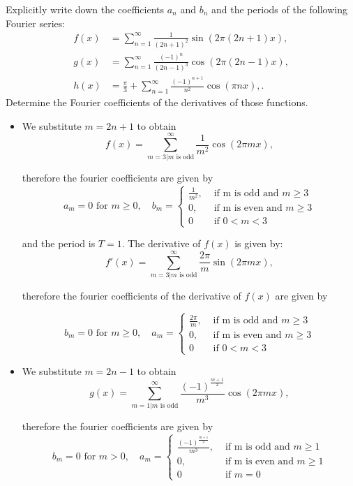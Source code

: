 \documentclass[11pt]{article}
\begin{document}
\begin{exercise}
    Explicitly write down the coefficients $a_n$ and $b_n$ and the periods of the following Fourier series:
    \begin{align*}
        f(x) &= \sum_{n=1}^{\infty} \frac{1}{(2n+1)^2}\sin(2\pi (2n+1) x),
        \\
        g(x) &= \sum_{n=1}^{\infty} \frac{(-1)^n}{(2n-1)^3}\cos(2\pi (2n-1) x),
        \\
        h(x) &= \frac \pi 3 + \sum_{n=1}^{\infty} \frac{(-1)^{n+1}}{n^2}\cos(\pi n x),
        .
    \end{align*}
    Determine the Fourier coefficients of the derivatives of those functions. 
\end{exercise}
\begin{solution}     
    \begin{itemize}
    \item We substitute $m = 2n+1$ to obtain 
    $$
            f(x) = \sum_{m=3|m \text{ is odd}}^{\infty} \frac{1}{m^2}\cos(2\pi m x),
    $$

    therefore the fourier coefficients are given by 
    $$
    a_m = 0 \text{ for } m \geq 0, \quad b_m = \begin{cases}\frac{1}{m^2}, & \text { if m is odd and }m \geq 3 \\ 0, & \text{ if m is even and } m \geq 3\\ 0 & \text{ if } 0< m < 3  \end{cases} 
    $$

    and the period is $T = 1$. The derivative of $f(x)$ is given by:
    $$
    f'(x) = \sum_{m=3|m \text{ is odd}}^{\infty} \frac{2\pi}{m}\sin(2\pi m x),
    $$

    therefore the fourier coefficients of the derivative of $f(x)$ are given by 

    $$
    b_m = 0 \text{ for } m \geq 0, \quad a_m = \begin{cases}\frac{2\pi}{m}, & \text { if m is odd and }m \geq 3 \\ 0, & \text{ if m is even and } m \geq 3\\ 0 & \text{ if } 0< m < 3  \end{cases} 
    $$

    \item We substitute $m = 2n-1$ to obtain 
    $$
        g(x) = \sum_{m=1|m \text{ is odd}}^{\infty} \frac{(-1)^{\frac{m+1}{2}}}{m^3}\cos(2\pi m x),
    $$

    therefore the fourier coefficients are given by 
    $$
    b_m = 0 \text{ for } m >0, \quad a_m = \begin{cases}\frac{(-1)^{\frac{m+1}{2}}}{m^3}, & \text { if m is odd and }m \geq 1 \\ 0, & \text{ if m is even and } m \geq 1\\ 0 & \text{ if } m = 0  \end{cases} 
    $$


\end{itemize}
\end{solution}
\end{document}

